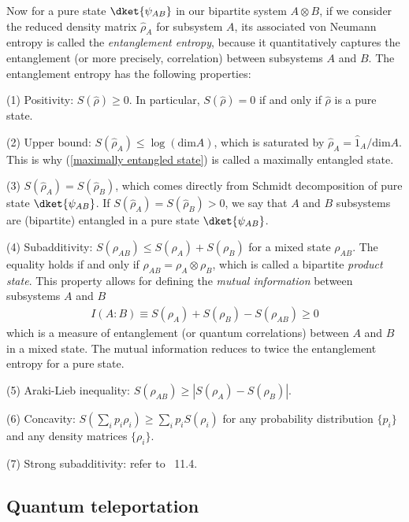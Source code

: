 Now for a pure state $\dket{\psi_{AB}}$ in our bipartite system $A\otimes B$, if we consider the reduced density matrix $\hat\rho_A$ for subsystem $A$, its associated von Neumann entropy is called the \emph{entanglement entropy}, because it quantitatively captures the entanglement (or more precisely, correlation) between subsystems $A$ and $B$. The entanglement entropy has the following properties: 

(1) Positivity: $S(\hat\rho)\geq0$. In particular, $S(\hat\rho)=0$ if and only if $\hat\rho$ is a pure state. 

(2) Upper bound: $S(\hat\rho_A)\leq\log(\text{dim}A)$, which is saturated by $\hat\rho_A=\hat 1_A/\text{dim} A$. This is why (\ref{maximally entangled state}) is called a maximally entangled state. 

(3) $S(\hat\rho_A)=S(\hat\rho_B)$, which comes directly from Schmidt decomposition of pure state $\dket{\psi_{AB}}$. If $S(\hat\rho_A)=S(\hat\rho_B)>0$, we say that $A$ and $B$ subsystems are (bipartite) entangled in a pure state $\dket{\psi_{AB}}$.

(4) Subadditivity: $S(\rho_{AB})\leq S(\rho_A)+S(\rho_B)$ for a mixed state $\rho_{AB}$. The equality holds if and only if $\rho_{AB}=\rho_A\otimes\rho_B$, which is called a bipartite \emph{product state}. This property allows for defining the \emph{mutual information} between subsystems $A$ and $B$
\begin{align}
I(A:B)\equiv S(\rho_A)+S(\rho_B)-S(\rho_{AB})\geq0
\end{align}
which is a measure of entanglement (or quantum correlations) between $A$ and $B$ in a mixed state. The mutual information reduces to twice the entanglement entropy for a pure state. 

(5) Araki-Lieb inequality: $S(\rho_{AB})\geq|S(\rho_A)-S(\rho_B)|$.

(6) Concavity: $S(\sum_i p_i\rho_i)\geq\sum_ip_iS(\rho_i)$ for any probability distribution $\{p_i\}$ and any density matrices $\{\rho_i\}$.

(7) Strong subadditivity: refer to \nielsen~11.4. 

\subsection{Quantum teleportation}

